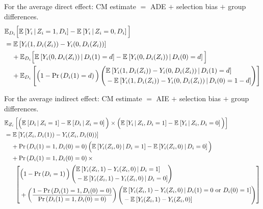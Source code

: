 For the average direct effect: CM estimate $=$ ADE $+$ selection bias $+$ group differences.
\vspace{-0.5cm}
\begin{align*}
    & \mathbb E_{D_i} \Big[
        \Egiven{Y_i}{Z_i = 1, D_i} - \Egiven{Y_i}{Z_i = 0, D_i} \Big] \\
    & = \E{Y_i(1, D_i(Z_i)) - Y_i(0, D_i(Z_i))} \\
    & \;\;\;\; + \mathbb E_{D_i} \Big[
        \Egiven{Y_i(0, D_i(Z_i))}{D_i(1) = d} 
        - \Egiven{Y_i(0, D_i(Z_i))}{D_i(0) = d} \Big] \\
    & \;\;\;\; + \E[D_i ]{
        \Big(1 - \Prob{D_i(1) = d} \Big)
        \left( \begin{aligned}
            &\Egiven{Y_i(1, D_i(Z_i)) - Y_i(0, D_i(Z_i))}{D_i(1) = d} \\ 
            &  - \Egiven{Y_i(1, D_i(Z_i)) - Y_i(0, D_i(Z_i))}{D_i(0) = 1- d}
            \end{aligned} \right) }
\end{align*}

For the average indirect effect: CM estimate $=$ AIE $+$ selection bias $+$ group differences.
\vspace{-0.5cm}
\begin{align*}
    &\E[Z_i]{
        \Big( \Egiven{D_i}{Z_i = 1} - \Egiven{D_i}{Z_i = 0} \Big) \times
        \Big( \Egiven{Y_i}{Z_i, D_i = 1} - \Egiven{Y_i}{Z_i, D_i = 0} \Big) } \\
    & = \E{Y_i(Z_i, D_i(1)) - Y_i(Z_i, D_i(0))} \\
    & \;\;\;\; + \Prob{D_i(1) = 1, D_i(0) = 0} \Big(
        \Egiven{Y_i(Z_i, 0)}{D_i = 1} - \Egiven{Y_i(Z_i, 0)}{D_i = 0} \Big) \\
    & \;\;\;\; + \Prob{D_i(1) = 1, D_i(0) = 0} \times \\
    & \;\;\;\; \;\; \left[ \begin{aligned}
        &\Big( 1 - \Prob{D_i=1} \Big)
        \left( \begin{aligned}
            &\Egiven{Y_i(Z_i, 1) - Y_i(Z_i, 0)}{D_i = 1} \\ 
            &  - \Egiven{Y_i(Z_i, 1) - Y_i(Z_i, 0)}{D_i = 0}
        \end{aligned} \right) \\
        &+ \left( \frac{1 - \Prob{D_i(1) = 1, D_i(0) = 0} }{
            \Prob{D_i(1) = 1, D_i(0) = 0}} \right)
        \left( \begin{aligned}
            &\Egiven{Y_i(Z_i, 1) - Y_i(Z_i, 0)}{D_i(1) = 0 \text{ or } D_i(0)=1} \\ 
            &  - \E{Y_i(Z_i, 1) - Y_i(Z_i, 0)}
        \end{aligned} \right)
    \end{aligned} \right]
\end{align*}

